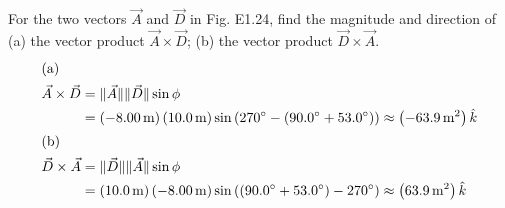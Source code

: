\documentclass[12pt]{article}
\newenvironment{problem}[2][]{
    \begin{trivlist}
        \item[
            {\bfseries #1}
            {\bfseries #2}
        ]
}{\end{trivlist}}
\newcommand{\Part}[1]{\shortintertext{(#1)}}
\newcommand{\magnitude}[1]{\lVert #1 \rVert}
\newcommand{\unit}[1]{\, \text{#1}}
\newcommand{\m}{\unit{m}}
\begin{document}
\begin{problem}{1.47}
For the two vectors $\vec{A}$ and $\vec{D}$ in Fig. E1.24, find the magnitude and direction of (a) the vector product $\vec{A} \times \vec{D}$; (b) the vector product $\vec{D} \times \vec{A}$.
\begin{align}
\Part{a}
\vec{A} \times \vec{D} &= \magnitude{\vec{A}}\magnitude{\vec{D}} \sin \phi \\
&= \left(-8.00 \m\right) \left(10.0 \m\right) \sin \left(270^\circ - \left(90.0^\circ + 53.0^\circ\right)\right) \approx \left(-63.9 \m^2\right) \hat{k} \\
\Part{b}
\vec{D} \times \vec{A} &= \magnitude{\vec{D}}\magnitude{\vec{A}} \sin \phi \\
&= \left(10.0 \m\right) \left(-8.00 \m\right) \sin \left(\left(90.0^\circ + 53.0^\circ\right) - 270^\circ\right) \approx \left(63.9 \m^2\right) \hat{k}
\end{align}
\end{problem}
\end{document}
